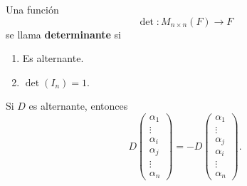 \documentclass[12pt,a4paper]{book}
\begin{document}
    \begin{definicion}
    \label{def:34}
        Una función
        \begin{equation*}
        \det:M_{n \times n}(F) \longrightarrow F
        \end{equation*}
        se llama \textbf{determinante} si
        \begin{enumerate}
            \item Es alternante.
            \item $\det(I_{n}) = 1$.
        \end{enumerate}
    \end{definicion}

    \begin{lema}
    \label{lema:6}
        Si $D$ es alternante, entonces
        \begin{equation*}
        D\begin{pmatrix}
            \alpha_{1}\\
            \vdots\\
            \alpha_{i}\\
            \alpha_{j}\\
            \vdots\\
            \alpha_{n}
        \end{pmatrix} = -D
        \begin{pmatrix}
            \alpha_{1}\\
            \vdots\\
            \alpha_{j}\\
            \alpha_{i}\\
            \vdots\\
            \alpha_{n}
        \end{pmatrix}.
        \end{equation*}
    \end{lema}
    
\end{document}
